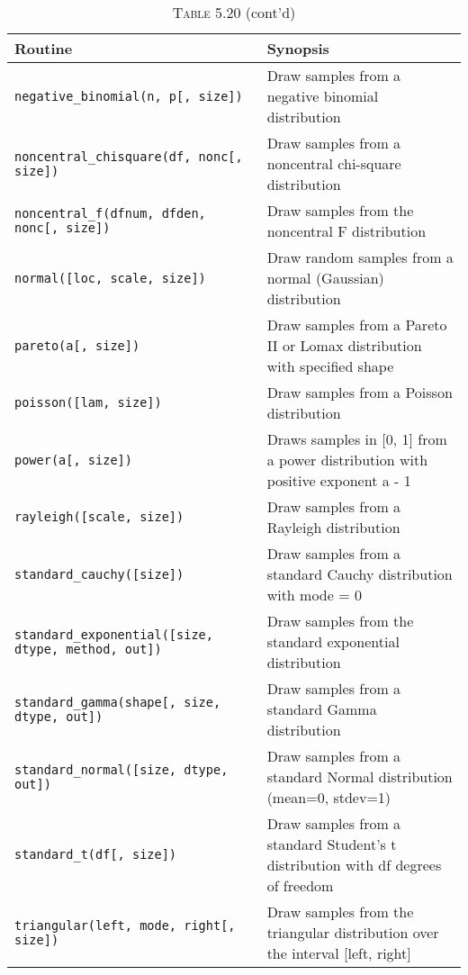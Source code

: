 \documentclass[a4paper,11pt]{book}
\numberwithin{figure}{chapter}
\numberwithin{table}{chapter}
\begin{document}
\begin{sidewaystable}[!htbp]
	\centering
	\caption*{\textsc{Table 5.20} (cont'd)} 
	\begin{tabular}{lp{12cm}}
		\toprule \toprule
			Routine & Synopsis \\
			\midrule
\texttt{negative\_binomial(n, p[, size])} &
                        Draw samples from a negative binomial distribution\\
\texttt{noncentral\_chisquare(df, nonc[, size])} &
                        Draw samples from a noncentral chi-square distribution\\
\texttt{noncentral\_f(dfnum, dfden, nonc[, size])} &
                        Draw samples from the noncentral F distribution\\
\texttt{normal([loc, scale, size])} &
                        Draw random samples from a normal (Gaussian) distribution\\
\texttt{pareto(a[, size])} &
                        Draw samples from a Pareto II or Lomax distribution with specified shape\\
\texttt{poisson([lam, size])} &
                        Draw samples from a Poisson distribution\\
\texttt{power(a[, size])} &
                        Draws samples in [0, 1] from a power distribution with positive exponent a - 1\\
\texttt{rayleigh([scale, size])} &
                        Draw samples from a Rayleigh distribution\\
\texttt{standard\_cauchy([size])} &
                        Draw samples from a standard Cauchy distribution with mode = 0\\
\texttt{standard\_exponential([size, dtype, method, out])} &
                        Draw samples from the standard exponential distribution\\
\texttt{standard\_gamma(shape[, size, dtype, out])} &
                        Draw samples from a standard Gamma distribution\\
\texttt{standard\_normal([size, dtype, out])} &
                        Draw samples from a standard Normal distribution (mean=0, stdev=1)\\
\texttt{standard\_t(df[, size])} &
                        Draw samples from a standard Student's t distribution with df degrees of freedom\\
\texttt{triangular(left, mode, right[, size])} &
                        Draw samples from the triangular distribution over the interval [left, right]\\

\end{tabular}
\end{sidewaystable}
\end{document}
